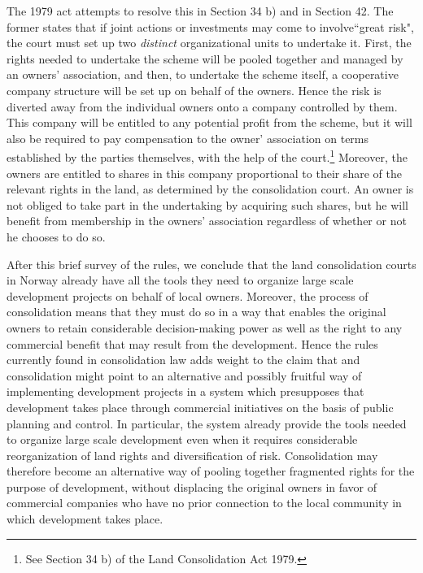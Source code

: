 The 1979 act attempts to resolve this in Section 34 b) and in Section 42. The former states that if joint actions or investments may come to involve``great risk", the court must set up two \emph{distinct} organizational units to undertake it. First, the rights needed to undertake the scheme will be pooled together and managed by an owners' association, and then, to undertake the scheme itself, a cooperative company structure will be set up on behalf of the owners. Hence the risk is diverted away from the individual owners onto a company controlled by them. This company will be entitled to any potential profit from the scheme, but it will also be required to pay compensation to the owner' association on terms established by the parties themselves, with the help of the court.\footnote{See Section 34 b) of the Land Consolidation Act 1979.} Moreover, the owners are entitled to shares in this company proportional to their share of the relevant rights in the land, as determined by the consolidation court. An owner is not obliged to take part in the undertaking by acquiring such shares, but he will benefit from membership in the owners' association regardless of whether or not he chooses to do so.

After this brief survey of the rules, we conclude that the land consolidation courts in Norway already have all the tools they need to organize large scale development projects on behalf of local owners. Moreover, the process of consolidation means that they must do so in a way that enables the original owners to retain considerable decision-making power as well as the right to any commercial benefit that may result from the development. Hence the rules currently found in consolidation law adds weight to the claim that and consolidation might point to an alternative and possibly fruitful way of implementing development projects in a system which presupposes that development takes place through commercial initiatives on the basis of public  planning and control. In particular, the system already provide the tools needed to organize
large scale development even when it requires considerable reorganization of land rights and diversification of risk. Consolidation may therefore become an alternative way of pooling together fragmented rights for the purpose of development, without displacing the original owners in favor of commercial companies who have no prior connection to the local community in which development takes place.

